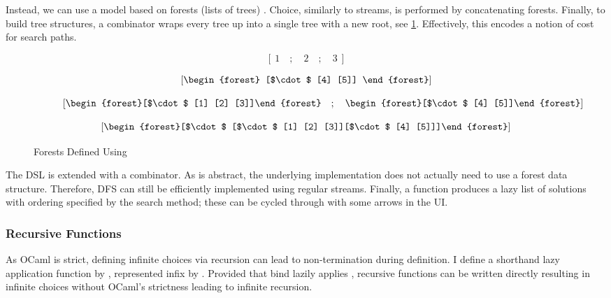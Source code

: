 Instead, we can use a model based on forests (lists of trees) \cite{Bunches}. Choice, similarly to streams, is performed by concatenating forests. Finally, to build tree structures, a  combinator wraps every tree up into a single tree with a new root, see \cref{fig:Wrap}. Effectively, this encodes a  notion of cost for search paths.

\begin{figure}[h]
\centering
\begin{subfigure}{0.45\textwidth}
\centering
\[\left[\ 1\quad ; \quad 2 \quad ; \quad 3\ \right]\]
\caption{  }
\end{subfigure}
\begin{subfigure}{0.45\textwidth}
\centering
\[\left[\vcenter{\hbox{\begin{forest}
[$\cdot$ [4] [5]]
\end{forest}}}\right]\]
\caption{}
\end{subfigure}
\begin{subfigure}{0.45\textwidth}
\centering
\[\left[\vcenter{\hbox{\begin{forest}[$\cdot$ [1] [2] [3]]\end{forest}}} \quad ; \quad\vcenter{\hbox{\begin{forest}[$\cdot$ [4] [5]]\end{forest}}}\right]\]
\caption{}
\end{subfigure}
\begin{subfigure}{0.45\textwidth}
\centering
\[\left[\vcenter{\hbox{\begin{forest}[$\cdot$ [$\cdot$ [1] [2] [3]][$\cdot$ [4] [5]]]\end{forest}}}\right]\]
\caption{}
\end{subfigure}
\caption{Forests Defined Using }
\label{fig:Wrap}
\end{figure}

The DSL is extended with a  combinator. As  is abstract, the underlying implementation does not actually need to use a forest data structure. Therefore, DFS can still be efficiently implemented using regular streams. Finally, a  function produces a lazy list of solutions with ordering specified by the search method; these can be cycled through with some arrows in the UI.

\subsubsection{Recursive Functions}
As OCaml is strict, defining infinite choices via recursion can lead to non-termination during definition. I define a shorthand lazy application function  by , represented infix by \code{|>-}. Provided that bind lazily applies , recursive functions can be written directly resulting in infinite choices without OCaml's strictness leading to infinite recursion.

